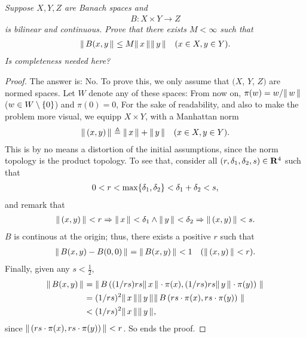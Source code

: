 \textit{
Suppose $X,Y,Z$ are Banach spaces and 
%
  \begin{align*}
    B:X\times Y \to Z
  \end{align*}
is bilinear and continuous. Prove that there exists $M<\infty$ such that 
%
  \begin{align*}
    \| \,B(x, y \, \|_{} \leq M \| \,x \, \|_{}\| \,y \, \|_{} \quad (x\in X, y\in Y).
  \end{align*}
%
Is completeness needed here?}
\begin{proof} The answer is: No. To prove this, we only assume that %
%
  $(X$, $Y$, $Z)$ %
%
are normed spaces. %
Let $W$ denote any of these spaces: From now on, %
%
  $\pi(w) = w/\| \,w \, \|_{}$ ($ w\in W \setminus \{0\}$) and %
  $\pi(0) = 0$,  %
%
For the sake of readability, %
and also to make the problem more visual, we equipp %
%
  $X\times Y$, %
%
with a Manhattan norm %
%
  \begin{align}
    \| \,(x, y) \, \|_{} \triangleq \| \,x \, \|_{} + \| \,y \, \|_{} \quad (x\in X, y \in Y).
  \end{align}
%
This is by no means a distortion of the initial assumptions, %
since the norm topology is the product topology. %
To see that, consider all %
%
  $(r, \delta_1, \delta_2, s)\in {\mathbf R}^4$ %
%
such that %
%
  \begin{align}
    0 < r < \max\{\delta_1, \delta_2\} < \delta_1 + \delta_2 < s, 
  \end{align}
%
and remark that %
%
  \begin{align}
    \| \,(x, y) \, \|_{} < r 
      \Rightarrow 
    \| \,x \, \|_{} < \delta_1 \land 
    \| \,y \, \|_{} < \delta_2
      \Rightarrow 
    \| \,(x, y) \, \|_{} < s .
  \end{align}
$B$ is continous at the origin; thus, there exists a positive $r$ such that %
%
  \begin{align}
    \| \,B(x,y) - B(0, 0) \, \|_{} = \| \,B(x,y) \, \|_{} < 1 \quad (\| \,(x, y) \, \|_{} < r).
  \end{align}
%
Finally, given any $s < \frac{1}{2}$, 
%
  \begin{align}
    \| \,B(x, y) \, \|_{} 
     & = 
    \| \,B\left(
        (1/rs) rs \| \,x \, \|_{}\cdot \pi(x), 
        (1/rs) rs \| \,y \, \|_{}\cdot \pi(y)
      \right) \, \|_{}\\
      & =
    (1/r s)^{2}\| \,x \, \|_{}\| \,y \, \|_{} 
    \| \, 
      B\left(
        rs\cdot \pi(x), 
        rs \cdot \pi(y) 
        \right) 
       \, \|_{} \\
      & < 
    (1/rs)^2 \| \,x \, \|_{}\| \,y \, \|_{},
  \end{align}
%
since $\| \,(rs \cdot \pi(x), rs \cdot \pi(y)) \, \|_{} < r$. So ends the proof. %
%
\end{proof}
